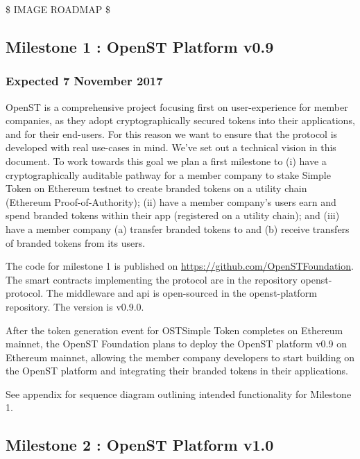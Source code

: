 \documentclass[12pt,a4paper, twocolumn]{article}
\begin{document}
\$ IMAGE ROADMAP \$

\subsection{Milestone 1 : OpenST Platform v0.9}
\subsubsection{Expected 7 November 2017}
OpenST is a comprehensive project focusing first on user-experience for member companies, as they adopt cryptographically secured tokens into their applications, and for their end-users.  For this reason we want to ensure that the protocol is developed with real use-cases in mind.  We’ve set out a technical vision in this document.  To work towards this goal we plan a first milestone to (i) have a cryptographically auditable pathway for a member company to stake Simple Token on Ethereum testnet to create branded tokens on a utility chain (Ethereum Proof-of-Authority); (ii) have a member company’s users earn and spend branded tokens within their app (registered on a utility chain); and (iii) have a member company (a) transfer branded tokens to and (b) receive transfers of branded tokens from its users. \par

The code for milestone 1 is published on \url{https://github.com/OpenSTFoundation}.  The smart contracts implementing the protocol are in the repository openst-protocol. The middleware and api is open-sourced in the openst-platform repository.  The version is v0.9.0. \par

After the token generation event for OSTSimple Token completes on Ethereum mainnet, the OpenST Foundation plans to deploy the OpenST platform v0.9 on Ethereum mainnet, allowing the member company developers to start building on the OpenST platform and integrating their branded tokens in their applications. \par

See appendix for sequence diagram outlining intended functionality for Milestone 1. \par

\subsection{Milestone 2 : OpenST Platform v1.0 }
\end{document}
